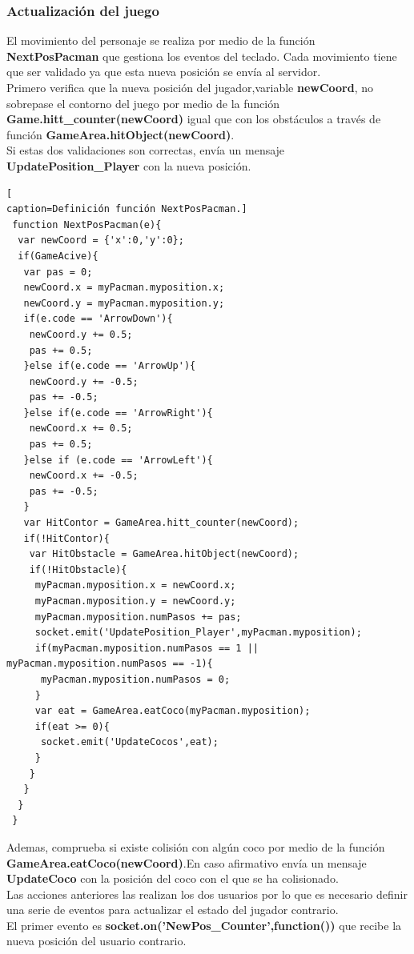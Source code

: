 \subsubsection*{Actualización del juego}
El movimiento del personaje se realiza por medio de la función \textbf{NextPosPacman} que gestiona los eventos del teclado. Cada movimiento tiene que ser validado ya que esta nueva posición se envía al servidor.
\\Primero verifica que la nueva posición del jugador,variable \textbf{newCoord}, no sobrepase el contorno del juego por medio de la función\textbf{ Game.hitt\_counter(newCoord)} igual que con los obstáculos a través de función \textbf{GameArea.hitObject(newCoord)}.
\\Si estas dos validaciones son correctas, envía un mensaje \textbf{UpdatePosition\_Player} con la nueva posición.
\begin{lstlisting}[
caption=Definición función NextPosPacman.]
 function NextPosPacman(e){
  var newCoord = {'x':0,'y':0};
  if(GameAcive){
   var pas = 0;
   newCoord.x = myPacman.myposition.x;
   newCoord.y = myPacman.myposition.y;
   if(e.code == 'ArrowDown'){
    newCoord.y += 0.5;
    pas += 0.5;
   }else if(e.code == 'ArrowUp'){
    newCoord.y += -0.5;
    pas += -0.5;
   }else if(e.code == 'ArrowRight'){
    newCoord.x += 0.5;
    pas += 0.5;
   }else if (e.code == 'ArrowLeft'){
    newCoord.x += -0.5;
    pas += -0.5;
   }
   var HitContor = GameArea.hitt_counter(newCoord);
   if(!HitContor){
    var HitObstacle = GameArea.hitObject(newCoord);
    if(!HitObstacle){
     myPacman.myposition.x = newCoord.x; 
     myPacman.myposition.y = newCoord.y;
     myPacman.myposition.numPasos += pas;
     socket.emit('UpdatePosition_Player',myPacman.myposition);
     if(myPacman.myposition.numPasos == 1 || myPacman.myposition.numPasos == -1){
      myPacman.myposition.numPasos = 0;
     }
     var eat = GameArea.eatCoco(myPacman.myposition);
     if(eat >= 0){
      socket.emit('UpdateCocos',eat);
     }
    }
   }
  }
 }
\end{lstlisting}
Ademas, comprueba si existe colisión con algún coco por medio de la función \textbf{GameArea.eatCoco(newCoord)}.En caso afirmativo envía un mensaje \textbf{UpdateCoco} con la posición del coco con el que se ha colisionado.
\\Las acciones anteriores las realizan los dos usuarios por lo que es necesario definir una serie de eventos para actualizar el estado del jugador contrario. 
\\El primer evento es \textbf{socket.on('NewPos\_Counter',function())} que recibe la nueva posición del usuario contrario.
